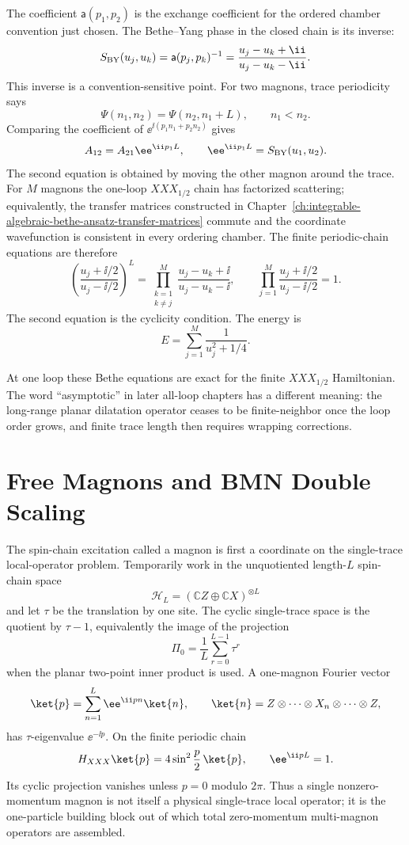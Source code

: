 The coefficient \(\mathsf a(p_1,p_2)\) is the exchange coefficient for the
ordered chamber convention just chosen.  The Bethe--Yang phase in the closed
chain is its inverse:
\[
  S_{\rm BY}(u_j,u_k)
  =
  \mathsf a(p_j,p_k)^{-1}
  =
  \frac{u_j-u_k+\ii}{u_j-u_k-\ii}.
\]
This inverse is a convention-sensitive point.  For two magnons, trace
periodicity says
\[
  \Psi(n_1,n_2)=\Psi(n_2,n_1+L),\qquad n_1<n_2.
\]
Comparing the coefficient of
\(\ee^{\ii(p_1n_1+p_2n_2)}\) gives
\[
  A_{12}=A_{21}\ee^{\ii p_1L},
  \qquad
  \ee^{\ii p_1L}=S_{\rm BY}(u_1,u_2).
\]
The second equation is obtained by moving the other magnon around the trace.
For \(M\) magnons the one-loop \(XXX_{1/2}\) chain has factorized scattering;
equivalently, the transfer matrices constructed in
Chapter~\ref{ch:integrable-algebraic-bethe-ansatz-transfer-matrices}
commute and the coordinate wavefunction is consistent in every ordering
chamber.  The finite periodic-chain equations are therefore
\begin{equation}
  \left(\frac{u_j+\ii/2}{u_j-\ii/2}\right)^L
  =
  \prod_{\substack{k=1\\k\neq j}}^M
  \frac{u_j-u_k+\ii}{u_j-u_k-\ii},
  \qquad
  \prod_{j=1}^M\frac{u_j+\ii/2}{u_j-\ii/2}=1 .
  \label{eq:planar-n4-one-loop-su2-bethe}
\end{equation}
The second equation is the cyclicity condition.  The energy is
\[
  E=\sum_{j=1}^M\frac{1}{u_j^2+1/4}.
\]

At one loop these Bethe equations are exact for the finite \(XXX_{1/2}\)
Hamiltonian.  The word ``asymptotic'' in later all-loop chapters has a
different meaning: the long-range planar dilatation operator ceases to be
finite-neighbor once the loop order grows, and finite trace length then
requires wrapping corrections.

\section{Free Magnons and BMN Double Scaling}
\label{sec:planar-n4-free-magnons-bmn}

The spin-chain excitation called a magnon is first a coordinate on the
single-trace local-operator problem.  Temporarily work in the unquotiented
length-\(L\) spin-chain space
\[
  \mathcal H_L=(\mathbb C Z\oplus\mathbb C X)^{\otimes L}
\]
and let \(\tau\) be the translation by one site.  The cyclic single-trace
space is the quotient by \(\tau-1\), equivalently the image of the projection
\[
  \Pi_0=\frac1L\sum_{r=0}^{L-1}\tau^r
\]
when the planar two-point inner product is used.  A one-magnon Fourier vector
\[
  \ket{p}
  =
  \sum_{n=1}^L \ee^{\ii pn}\ket{n},
  \qquad \ket{n}=Z\otimes\cdots\otimes X_n\otimes\cdots\otimes Z,
\]
has \(\tau\)-eigenvalue \(\ee^{-\ii p}\).  On the finite periodic chain
\[
  H_{XXX}\ket{p}
  =
  4\sin^2\frac p2\,\ket{p},
  \qquad \ee^{\ii pL}=1 .
\]
Its cyclic projection vanishes unless \(p=0\) modulo \(2\pi\).  Thus a
single nonzero-momentum magnon is not itself a physical single-trace local
operator; it is the one-particle building block out of which total
zero-momentum multi-magnon operators are assembled.

